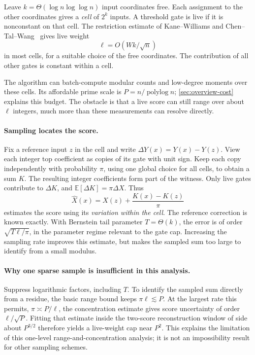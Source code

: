 \documentclass[11pt,letterpaper]{article}
\theoremstyle{definition}
\theoremstyle{remark}
\newcommand{\E}{\mathbb E}
\begin{document}
Leave \(k=\Theta(\log n\log\log n)\) input coordinates free.
Each assignment to the other coordinates gives a \emph{cell} of
\(2^k\) inputs. A threshold gate is live if it is nonconstant on
that cell. The restriction estimate of Kane--Williams and
Chen--Tal--Wang~\cite{KW16,CTW26} gives live weight
\[
 \ell=O(Wk/\sqrt n)
\]
in most cells, for a suitable choice of the free coordinates.
The contribution of all other gates is constant within a cell.

The algorithm can batch-compute modular counts and low-degree moments
over these cells. Its affordable prime scale is
\(P=n/\operatorname{polylog}n\); \cref{sec:overview-cost}
explains this budget. The obstacle is that a live score can still
range over about \(\ell\) integers, much more than these measurements
can resolve directly.

\paragraph{Sampling locates the score.}
Fix a reference input \(z\) in the cell and write
\(\Delta Y(x)=Y(x)-Y(z)\). View each integer top coefficient as
copies of its gate with unit sign. Keep each copy independently with
probability \(\pi\), using one global choice for all cells, to obtain
a sum \(K\). The resulting integer coefficients form part of the
witness. Only live gates contribute to \(\Delta K\), and
\(\E[\Delta K]=\pi\Delta X\). Thus
\[
 \widehat X(x)=X(z)+\frac{K(x)-K(z)}{\pi}
\]
estimates the score using its \emph{variation within the cell}.
The reference correction is known exactly. With Bernstein tail
parameter \(T=\Theta(k)\), the error is of order
\(\sqrt{T\ell/\pi}\), in the parameter regime relevant to the gate cap.
Increasing the sampling rate improves this estimate, but makes the
sampled sum too large to identify from a small modulus.

\paragraph{Why one sparse sample is insufficient in this analysis.}
Suppress logarithmic factors, including \(T\). To identify the
sampled sum directly from a residue, the basic range bound keeps
\(\pi\ell\lesssim P\). At the largest rate this permits,
\(\pi\asymp P/\ell\), the concentration estimate gives score
uncertainty of order \(\ell/\sqrt P\). Fitting that estimate inside
the two-score reconstruction window of side about \(P^{3/2}\)
therefore yields a live-weight cap near \(P^2\). This explains the
limitation of this one-level range-and-concentration analysis;
it is not an impossibility result for other sampling schemes.
\end{document}
